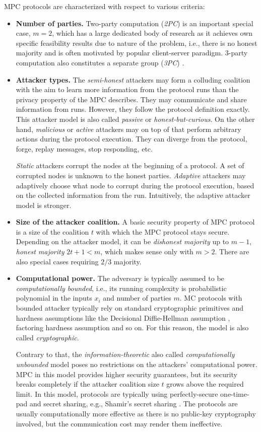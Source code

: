 \documentclass[
  digital, %
  twoside, %
  table,   %
  lof,     %
  lot,     %
]{fithesis3}
\newcommand{\itembf}[1]{\item {\bf{#1}}}
\newcounter{ph4_show_guides}
\theoremstyle{definition}
\theoremstyle{remark}
\begin{document}
MPC protocols are characterized with respect to various criteria:
\begin{itemize}
    \itembf{Number of parties.} Two-party computation (\emph{2PC}) is an important special case, $m=2$, which has a large dedicated body of research as it achieves own specific feasibility results due to nature of the problem, i.e., there is no honest majority and is often motivated by popular client-server paradigm. 3-party computation also constitutes a separate group (\emph{3PC}) \cite{CKMZ14, MRZ15}.

    \itembf{Attacker types.} The \emph{semi-honest} attackers may form a colluding coalition with the aim to learn more information from the protocol runs than the privacy property of the MPC describes. They may communicate and share information from runs. However, they follow the protocol definition exactly. This attacker model is also called \emph{passive} or \emph{honest-but-curious}. 
    On the other hand, \emph{malicious} or \emph{active} attackers may on top of that perform arbitrary actions during the protocol execution. They can diverge from the protocol, forge, replay messages, stop responding, etc.

    \emph{Static} attackers corrupt the nodes at the beginning of a protocol. A set of corrupted nodes is unknown to the honest parties. \emph{Adaptive} attackers may adaptively choose what node to corrupt during the protocol execution, based on the collected information from the run. Intuitively, the adaptive attacker model is stronger.
    
    \itembf{Size of the attacker coalition.} A basic security property of MPC protocol is a size of the coalition $t$ with which the MPC protocol stays secure. Depending on the attacker model, it can be \emph{dishonest majority} up to $m-1$, \emph{honest majority} $2t+1 < m$, which makes sense only with $m>2$. There are also special cases requiring $2/3$ majority.

    \itembf{Computational power.} The adversary is typically assumed to be \emph{computationally bounded}, i.e., its running complexity is probabilistic polynomial in the inputs $x_i$ and number of parties $m$.
    MC protocols with bounded attacker typically rely on standard cryptographic primitives and hardness assumptions like the Decisional Diffie-Hellman assumption \cite{KL07}, factoring hardness assumption and so on. For this reason, the model is also called \emph{cryptographic}.
    
    Contrary to that, the \emph{information-theoretic} also called \emph{computationally unbounded} model poses no restrictions on the attackers' computational power. MPC in this model provides higher security guarantees, but its security breaks completely if the attacker coalition size $t$ grows above the required limit. 
    In this model, protocols are typically using perfectly-secure one-time-pad and secret sharing, e.g., Shamir's secret sharing \cite{Shamir79}. The protocols are usually computationally more effective as there is no public-key cryptography involved, but the communication cost may render them ineffective. 
    

\end{itemize}
\end{document}
